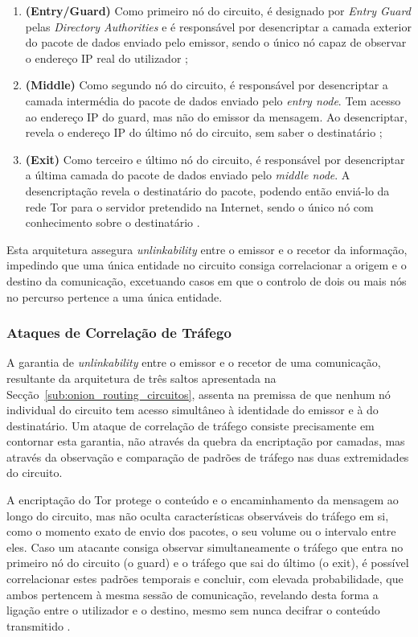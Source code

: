 \begin{enumerate}
    \item \textbf{(Entry/Guard)} Como primeiro nó do circuito, é designado por \textit{Entry Guard} pelas \textit{Directory Authorities} e é responsável por desencriptar a camada exterior do pacote de dados enviado pelo emissor, sendo o único nó capaz de observar o endereço IP real do utilizador \cite{mccoy2008shining};
    \item \textbf{(Middle)} Como segundo nó do circuito, é responsável por desencriptar a camada intermédia do pacote de dados enviado pelo \textit{entry node}. Tem acesso ao endereço IP do guard, mas não do emissor da mensagem. Ao desencriptar, revela o endereço IP do último nó do circuito, sem saber o destinatário \cite{barker2011using};
    \item \textbf{(Exit)} Como terceiro e último nó do circuito, é responsável por desencriptar a última camada do pacote de dados enviado pelo \textit{middle node}. A desencriptação revela o destinatário do pacote, podendo então enviá-lo da rede Tor para o servidor pretendido na Internet, sendo o único nó com conhecimento sobre o destinatário \cite{mccoy2008shining}.
\end{enumerate}

Esta arquitetura assegura \textit{unlinkability} entre o emissor e o recetor da informação, impedindo que uma única entidade no circuito consiga correlacionar a origem e o destino da comunicação, excetuando casos em que o controlo de dois ou mais nós no percurso pertence a uma única entidade.

\subsubsection{Ataques de Correlação de Tráfego}

A garantia de \textit{unlinkability} entre o emissor e o recetor de uma comunicação, resultante da arquitetura de três saltos apresentada na Secção~\ref{sub:onion_routing_circuitos}, assenta na premissa de que nenhum nó individual do circuito tem acesso simultâneo à identidade do emissor e à do destinatário. Um ataque de correlação de tráfego consiste precisamente em contornar esta garantia, não através da quebra da encriptação por camadas, mas através da observação e comparação de padrões de tráfego nas duas extremidades do circuito.

A encriptação do Tor protege o conteúdo e o encaminhamento da mensagem ao longo do circuito, mas não oculta características observáveis do tráfego em si, como o momento exato de envio dos pacotes, o seu volume ou o intervalo entre eles. Caso um atacante consiga observar simultaneamente o tráfego que entra no primeiro nó do circuito (o guard) e o tráfego que sai do último (o exit), é possível correlacionar estes padrões temporais e concluir, com elevada probabilidade, que ambos pertencem à mesma sessão de comunicação, revelando desta forma a ligação entre o utilizador e o destino, mesmo sem nunca decifrar o conteúdo transmitido \cite{mccoy2008shining, barker2011using}.

